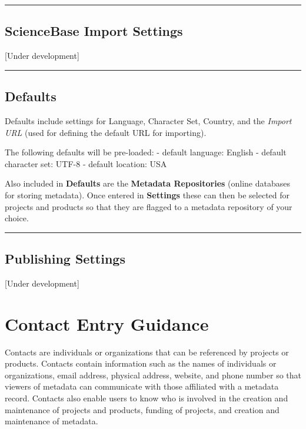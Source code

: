 \documentclass[
]{book}
\begin{document}
\begin{center}\rule{0.5\linewidth}{\linethickness}\end{center}

\hypertarget{sciencebase-import-settings}{%
\section{ScienceBase Import Settings}\label{sciencebase-import-settings}}

{[}Under development{]}

\begin{center}\rule{0.5\linewidth}{\linethickness}\end{center}

\hypertarget{defaults}{%
\section{Defaults}\label{defaults}}

Defaults include settings for Language, Character Set, Country, and the \emph{Import URL }(used for defining the default URL for importing).

The following defaults will be pre-loaded:
- default language: English
- default character set: UTF-8
- default location: USA

Also included in \textbf{Defaults} are the \textbf{Metadata Repositories} (online databases for storing metadata). Once entered in \textbf{Settings} these can then be selected for projects and products so that they are flagged to a metadata repository of your choice.

\begin{center}\rule{0.5\linewidth}{\linethickness}\end{center}

\hypertarget{publishing-settings}{%
\section{Publishing Settings}\label{publishing-settings}}

{[}Under development{]}

\hypertarget{contact-entry-guidance}{%
\chapter{Contact Entry Guidance}\label{contact-entry-guidance}}

Contacts are individuals or organizations that can be referenced by projects or products. Contacts contain information such as the names of individuals or organizations, email address, physical address, website, and phone number so that viewers of metadata can communicate with those affiliated with a metadata record. Contacts also enable users to know who is involved in the creation and maintenance of projects and products, funding of projects, and creation and maintenance of metadata.
\end{document}
